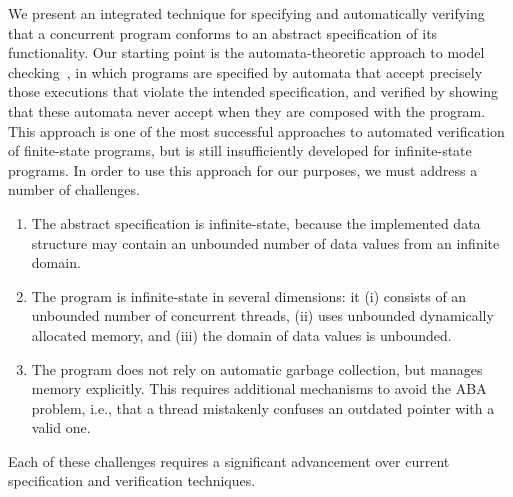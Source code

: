 We present an integrated technique for specifying and automatically
verifying that a concurrent program conforms to an abstract
specification of its functionality.
Our starting point is the
automata-theoretic approach to model checking~\cite{VW:modelchecking}, in which
programs are specified by automata that accept precisely those
executions that violate the intended specification, and
verified by showing that these automata never accept when they are
composed with the program.
This approach is one of the most successful approaches to automated
verification of finite-state programs, but is still insufficiently developed
for infinite-state programs. In order to use this approach for our purposes,
we must address a number of challenges.
%
\begin{enumerate}
\item
The abstract specification is infinite-state, 
because the implemented data structure may 
contain an unbounded number of data values from
an infinite domain.
\item
The program is infinite-state in several dimensions: it
(i) consists of an unbounded number of concurrent threads, 
(ii) uses unbounded dynamically allocated memory, and 
(iii) the domain of data values is unbounded.
\item
The program does not rely on automatic garbage collection, but manages
memory explicitly. This requires additional mechanisms to avoid
the ABA problem, i.e., that a thread mistakenly confuses an outdated
pointer with a valid one.
\end{enumerate}
%
Each of these challenges requires a significant advancement over current
specification and verification techniques.

